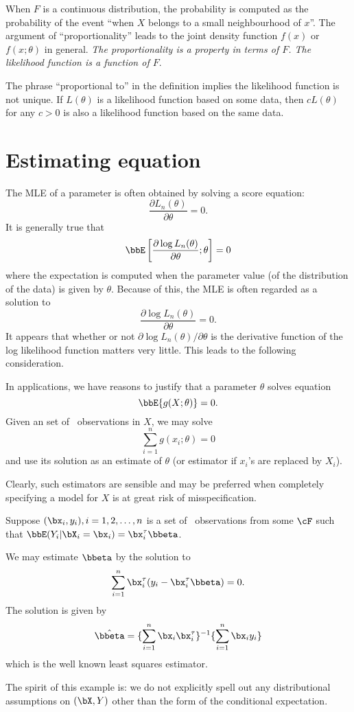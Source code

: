 When $F$ is a continuous distribution, the probability is computed
as the probability of the event ``when $X$ belongs to a 
small neighbourhood of $x$''. The argument of ``proportionality'' leads to
the joint density function $f(x)$ or $f(x; \theta)$ in general.
{\it The proportionality is a property in terms of $F$. 
The likelihood function is a function of $F$}.

The phrase ``proportional to'' in the definition implies the likelihood
function is not unique. If $L(\theta)$ is a likelihood function based
on some data, then $c L(\theta)$ for any $c>0$ is also a likelihood
function based on the same data.

\section{Estimating equation}
The MLE of a parameter is often obtained by solving a score equation:
\[
\frac{ \partial L_n(\theta) }{\partial \theta} = 0.
\]
It is generally true that
\[
\bbE \left [ \frac{ \partial \log L_n(\theta) }{\partial \theta} ; \theta \right ] = 0
\]
where the expectation is computed when the parameter value
(of the distribution of the data) is given by $\theta$.
Because of this, the MLE is often regarded as a solution to
\[ 
\frac{ \partial \log L_n(\theta) }{\partial \theta} =0.
\]
It appears that whether or not $\partial \log L_n(\theta)/\partial \theta$
is the derivative function of the log likelihood function matters very
little. This leads to the following consideration.

In applications, we have reasons to justify that a parameter $\theta$
solves equation
\[
\bbE \{ g(X; \theta) \} = 0.
\]
Given an set of \iid\ observations in $X$, we may solve
\[
\sum_{i=1}^n g(x_i; \theta)= 0
\]
and use its solution as an estimate of 
$\theta$ (or estimator if $x_i$'s are replaced by $X_i$).

Clearly, such estimators are sensible and may be preferred when completely
specifying a model for $X$ is at great risk of misspecification.

\begin{example}
Suppose $(\bx_i, y_i), i=1, 2, \ldots, n$ is a set of \iid\ observations from some
$\cF$ such that $\bbE(Y_i| \bX_i = \bx_i) = \bx_i^\tau \bbeta$.

We may estimate $\bbeta$ by the solution to
\[
\sum_{i=1}^n \bx_i^\tau (y_i - \bx_i^\tau \bbeta) = 0.
\]
The solution is given by
\[
\hat \bbeta = \{ \sum_{i=1}^n \bx_i \bx_i^\tau\}^{-1} \{ \sum_{i=1}^n \bx_i y_i\}
\]
which is the well known least squares estimator.

The spirit of this example is: we do not explicitly spell out any distributional
assumptions on $(\bX, Y)$ other than the form of the conditional expectation.
\end{example}

